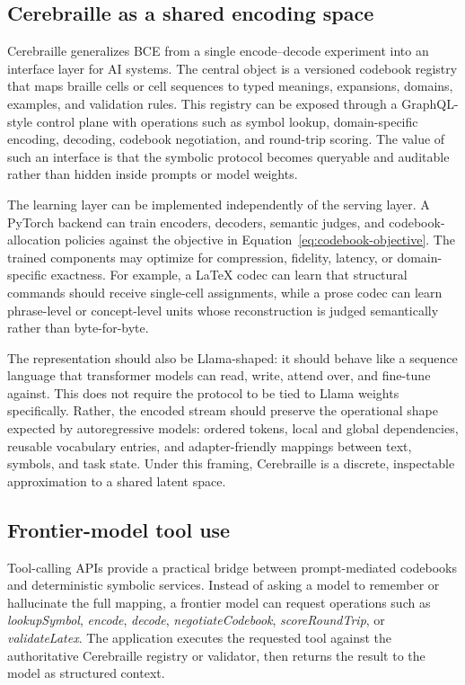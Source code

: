 \documentclass[11pt]{article}
\begin{document}
\subsection{Cerebraille as a shared encoding space}
Cerebraille generalizes BCE from a single encode--decode experiment into an interface layer for AI systems. The central object is a versioned codebook registry that maps braille cells or cell sequences to typed meanings, expansions, domains, examples, and validation rules. This registry can be exposed through a GraphQL-style control plane with operations such as symbol lookup, domain-specific encoding, decoding, codebook negotiation, and round-trip scoring. The value of such an interface is that the symbolic protocol becomes queryable and auditable rather than hidden inside prompts or model weights.

The learning layer can be implemented independently of the serving layer. A PyTorch backend can train encoders, decoders, semantic judges, and codebook-allocation policies against the objective in Equation~\ref{eq:codebook-objective}. The trained components may optimize for compression, fidelity, latency, or domain-specific exactness. For example, a LaTeX codec can learn that structural commands should receive single-cell assignments, while a prose codec can learn phrase-level or concept-level units whose reconstruction is judged semantically rather than byte-for-byte.

The representation should also be Llama-shaped: it should behave like a sequence language that transformer models can read, write, attend over, and fine-tune against. This does not require the protocol to be tied to Llama weights specifically. Rather, the encoded stream should preserve the operational shape expected by autoregressive models: ordered tokens, local and global dependencies, reusable vocabulary entries, and adapter-friendly mappings between text, symbols, and task state. Under this framing, Cerebraille is a discrete, inspectable approximation to a shared latent space.

\subsection{Frontier-model tool use}
Tool-calling APIs provide a practical bridge between prompt-mediated codebooks and deterministic symbolic services. Instead of asking a model to remember or hallucinate the full mapping, a frontier model can request operations such as \emph{lookupSymbol}, \emph{encode}, \emph{decode}, \emph{negotiateCodebook}, \emph{scoreRoundTrip}, or \emph{validateLatex}. The application executes the requested tool against the authoritative Cerebraille registry or validator, then returns the result to the model as structured context.
\end{document}
